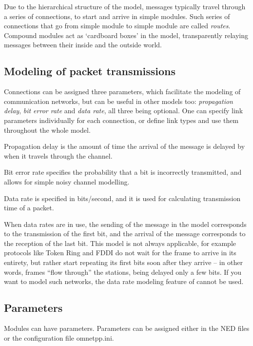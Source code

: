 Due to the hierarchical structure of the model, messages typically
travel through a series of connections, to start and arrive in simple
modules. Such series of connections that go from simple module to
simple module are called \textit{routes}.  Compound modules act as
`cardboard boxes' in the model, transparently relaying messages
between their inside and the outside world.


\subsection{Modeling of packet transmissions}

Connections can be assigned three parameters, which facilitate
the modeling of communication networks, but can be useful in
other models too: \textit{propagation delay}, \textit{bit error rate}
and \textit{data rate}, all three being optional. One can specify
link parameters individually for each connection, or define link types
and use them throughout the whole model.

Propagation delay is the amount of time the arrival of
the message is delayed by when it travels through the channel.

Bit error rate specifies the probability that a bit is incorrectly
transmitted, and allows for simple noisy channel modelling.

Data rate is specified in bits/second, and it is used for calculating
transmission time of a packet.

When data rates are in use, the sending of the message in the model
corresponds to the transmission of the first bit, and
the arrival of the message corresponds to the reception
of the last bit. This model is not always applicable,
for example protocols like Token Ring and FDDI do not wait
for the frame to arrive in its entirety, but rather start repeating
its first bits soon after they arrive -- in other words,
frames ``flow through'' the stations, being delayed only a few bits.
If you want to model such networks, the data rate modeling feature
of {\opp} cannot be used.



\subsection{Parameters}

Modules can have parameters. Parameters can be assigned either
in the NED files or the configuration file omnetpp.ini.

